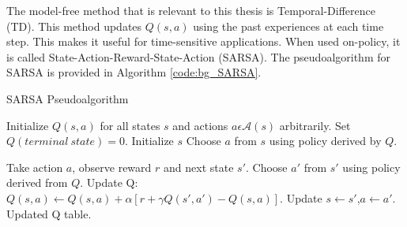 	\par The model-free method that is relevant to this thesis is Temporal-Difference (TD). This method updates $Q(s,a)$ using the past experiences at each time step. This makes it useful for time-sensitive applications. When used on-policy, it is called State-Action-Reward-State-Action (SARSA). The pseudoalgorithm for SARSA is provided in Algorithm \ref{code:bg_SARSA}.
	
	\begin{algorithm}[ht]
	\caption{SARSA Pseudoalgorithm}
	\label{code:bg_SARSA}
	\begin{algorithmic}[1]
		\State Initialize $Q(s,a)$ for all states $s$ and actions $a \epsilon \mathcal{A}(s)$ arbitrarily. Set $Q(terminal\ state)=0$.
		\State Initialize $s$
		\State Choose $a$ from $s$ using policy derived by $Q$.
		
		\State Take action $a$, observe reward $r$ and next state $s'$.
		\State Choose $a'$ from $s'$ using policy derived from $Q$.
		\State Update Q: $Q(s,a) \gets Q(s,a) + \alpha[r + \gamma Q(s',a')-Q(s,a)]$.
		\State Update $s \gets s'$,$a \gets a'$.
		\EndWhile
		\EndWhile
		\State \Return Updated Q table.
		\EndProcedure
	\end{algorithmic}
\end{algorithm}

